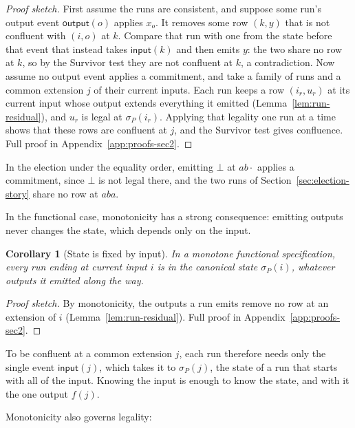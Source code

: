 \documentclass[sigconf]{cidr-2027}
\newtheorem{corollary}{Corollary}
\theoremstyle{remark}
\newcommand{\commitment}{commitment\xspace}
\newcommand{\outrel}{extends\xspace}          %
\begin{document}
\begin{proof}[Proof sketch]
First assume the runs are consistent, and suppose some run's output event
$\mathsf{output}(o)$ applies $x_o$. It removes some row $(k,y)$ that is not confluent with $(i,o)$ at $k$. Compare that run with one from the state
before that event that instead takes $\mathsf{input}(k)$ and then emits $y$:
the two share no row at $k$, so by the Survivor test they are not confluent at
$k$, a contradiction. Now assume no output event applies a \commitment, and
take a family of runs and a common extension $j$ of their current inputs. Each run keeps a row
$(i_r,u_r)$ at its current input whose output \outrel everything it emitted
(Lemma~\ref{lem:run-residual}), and $u_r$ is legal at $\sigma_P(i_r)$. Applying that legality one run at a time shows that these rows are confluent at $j$, and the Survivor test gives confluence. Full proof in
Appendix~\ref{app:proofs-sec2}.
\end{proof}


\textcolor{reviewed}{In the election under the equality order, emitting $\bot$ at $ab\cdot$ applies
a \commitment, since $\bot$ is not legal there, and the two runs of
Section~\ref{sec:election-story} share no row at $aba$.}

In the functional case, monotonicity has a strong consequence: emitting outputs
never changes the state, which depends only on the input.

\begin{corollary}[State is fixed by input]
\label{cor:state-by-input}
\textcolor{reviewed}{In a monotone functional specification, every run ending at current
input $i$ is in the canonical state $\sigma_P(i)$, whatever outputs it emitted
along the way.}
\end{corollary}

\begin{proof}[Proof sketch]
\textcolor{reviewed}{By monotonicity, the outputs a run emits remove no row at an extension of $i$ (Lemma~\ref{lem:run-residual}).} Full proof in Appendix~\ref{app:proofs-sec2}.
\end{proof}

To be confluent at a common extension $j$, each run therefore needs only the
single event $\mathsf{input}(j)$, which takes it to $\sigma_P(j)$, the state of a
run that starts with all of the input. Knowing the input is enough to know the state, and with it the one
output $f(j)$.

Monotonicity also governs legality:
\end{document}
